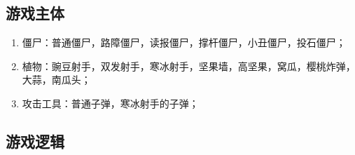 \documentclass[12pt,a4paper,UTF8]{article}
\begin{document}
    \subsection{游戏主体}
        \begin{enumerate}
          \item 僵尸：普通僵尸，路障僵尸，读报僵尸，撑杆僵尸，小丑僵尸，投石僵尸；
          \item 植物：豌豆射手，双发射手，寒冰射手，坚果墙，高坚果，窝瓜，樱桃炸弹，大蒜，南瓜头；
          \item 攻击工具：普通子弹，寒冰射手的子弹；
        \end{enumerate}

    \subsection{游戏逻辑}
\end{document}
